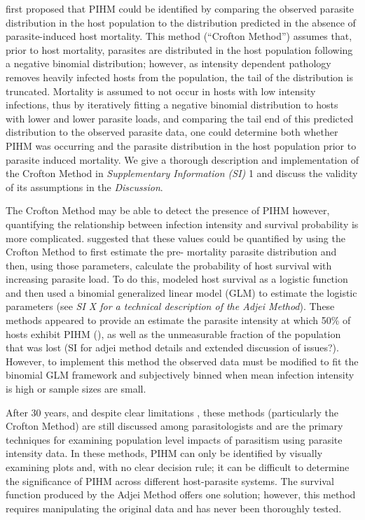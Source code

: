 \documentclass[12pt, a4paper]{article}
\begin{document}
\cite{Crofton1971a} first proposed that PIHM could be identified by comparing the
observed parasite distribution in the host population to the distribution
predicted in the absence of parasite-induced host mortality. This method
(“Crofton Method”) assumes that, prior to host mortality, parasites are
distributed in the host population following a negative binomial distribution;
however, as intensity dependent pathology removes heavily infected hosts from
the population, the tail of the distribution is truncated. Mortality is assumed
to not occur in hosts with low intensity infections, thus by iteratively
fitting a negative binomial distribution to hosts with lower and lower parasite
loads, and comparing the tail end of this predicted distribution to the
observed parasite data, one could determine both whether PIHM was occurring and
the parasite distribution in the host population prior to parasite induced
mortality. We give a thorough description and implementation of the Crofton
Method in \emph{Supplementary Information (SI)} 1 and discuss the validity of
its assumptions in the \emph{Discussion}.

The Crofton Method may be able to detect the presence of PIHM however,
quantifying the relationship between infection intensity and survival
probability is more complicated. \cite{Adjei1986} suggested that these values
could be quantified by using the Crofton Method to first estimate the pre-
mortality parasite distribution and then, using those parameters, calculate the
probability of host survival with increasing parasite load. To do this,
\cite{Adjei1986} modeled host survival as a logistic function and then used a
binomial generalized linear model (GLM) to estimate the logistic parameters (see \emph{SI X for a technical description of the Adjei Method}).
These methods appeared to provide an estimate the parasite intensity at which
50\% of hosts exhibit PIHM (), as well as the unmeasurable fraction of the
population that was lost (SI for adjei method details and extended discussion
of issues?). However, to implement this method the observed data must be
modified to fit the binomial GLM framework and subjectively binned when mean
infection intensity is high or sample sizes are small.

After 30 years, and despite clear limitations \citep{McCallum2000a}, these
methods (particularly the Crofton Method) are still discussed among
parasitologists and are the primary techniques for examining population level
impacts of parasitism using parasite intensity data. In these methods, PIHM can
only be identified by visually examining plots and, with no clear decision
rule; it can be difficult to determine the significance of PIHM across
different host-parasite systems. The survival function produced by the Adjei
Method offers one solution; however, this method requires manipulating the
original data and has never been thoroughly tested.
\end{document}
